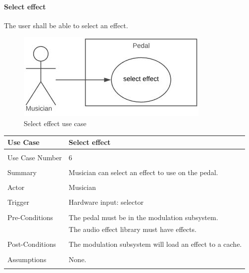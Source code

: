             \paragraph{Select effect} 
            The user shall be able to select an effect.
            \begin{figure}[!ht]
                \centering
                \includegraphics[width=.5\textwidth]{diagrams/use_cases/uc-select-effect.JPG}
                \caption{Select effect use case}
                \label{fig:uc-select-effect}
            \end{figure}
            \clearpage
            \begin{table}[!ht]
                \centering
                \begin{tabular}{l l}
                    Use Case & Select effect \\
                    \hline \\
                    Use Case Number & 6 \\ \\
                    Summary & Musician can select an effect to use on the pedal. \\ \\
                    Actor & Musician \\ \\
                    Trigger & Hardware input: selector \\ \\
                    Pre-Conditions & The pedal must be in the modulation subsystem. \\
                    & The audio effect library must have effects. \\ \\
                    Post-Conditions & The modulation subsystem will load an effect to a cache. \\ \\
                    Assumptions & None.\\ \\
                \end{tabular}
            \end{table}            
            
